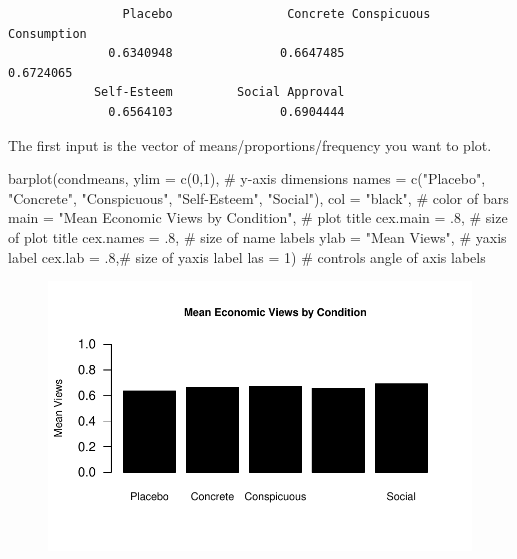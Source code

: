 \documentclass[
  letterpaper,
  DIV=11,
  numbers=noendperiod]{scrreprt}
\newenvironment{Shaded}{\begin{snugshade}}{\end{snugshade}}
\newcommand{\AttributeTok}[1]{\textcolor[rgb]{0.40,0.45,0.13}{#1}}
\newcommand{\CommentTok}[1]{\textcolor[rgb]{0.37,0.37,0.37}{#1}}
\newcommand{\DecValTok}[1]{\textcolor[rgb]{0.68,0.00,0.00}{#1}}
\newcommand{\FunctionTok}[1]{\textcolor[rgb]{0.28,0.35,0.67}{#1}}
\newcommand{\NormalTok}[1]{\textcolor[rgb]{0.00,0.23,0.31}{#1}}
\newcommand{\StringTok}[1]{\textcolor[rgb]{0.13,0.47,0.30}{#1}}
\begin{document}
\begin{verbatim}
                Placebo                Concrete Conspicuous Consumption 
              0.6340948               0.6647485               0.6724065 
            Self-Esteem         Social Approval 
              0.6564103               0.6904444 
\end{verbatim}

The first input is the vector of means/proportions/frequency you want to
plot.

\begin{Shaded}
\begin{Highlighting}[]
\FunctionTok{barplot}\NormalTok{(condmeans,}
        \AttributeTok{ylim =}  \FunctionTok{c}\NormalTok{(}\DecValTok{0}\NormalTok{,}\DecValTok{1}\NormalTok{), }\CommentTok{\# y{-}axis dimensions}
        \AttributeTok{names =} \FunctionTok{c}\NormalTok{(}\StringTok{"Placebo"}\NormalTok{, }\StringTok{"Concrete"}\NormalTok{, }\StringTok{"Conspicuous"}\NormalTok{, }
                  \StringTok{"Self{-}Esteem"}\NormalTok{, }\StringTok{"Social"}\NormalTok{),}
        \AttributeTok{col =} \StringTok{"black"}\NormalTok{, }\CommentTok{\# color of bars}
        \AttributeTok{main =} \StringTok{"Mean Economic Views by Condition"}\NormalTok{, }\CommentTok{\# plot title}
        \AttributeTok{cex.main =}\NormalTok{ .}\DecValTok{8}\NormalTok{, }\CommentTok{\# size of plot title}
        \AttributeTok{cex.names =}\NormalTok{ .}\DecValTok{8}\NormalTok{, }\CommentTok{\# size of name labels}
        \AttributeTok{ylab =} \StringTok{"Mean Views"}\NormalTok{, }\CommentTok{\# yaxis label}
        \AttributeTok{cex.lab =}\NormalTok{ .}\DecValTok{8}\NormalTok{,}\CommentTok{\# size of yaxis label}
        \AttributeTok{las =} \DecValTok{1}\NormalTok{) }\CommentTok{\# controls angle of axis labels}
\end{Highlighting}
\end{Shaded}

\begin{figure}[H]

{\centering \includegraphics{04-Visualization_files/figure-pdf/unnamed-chunk-9-1.pdf}

}

\end{figure}
\end{document}
